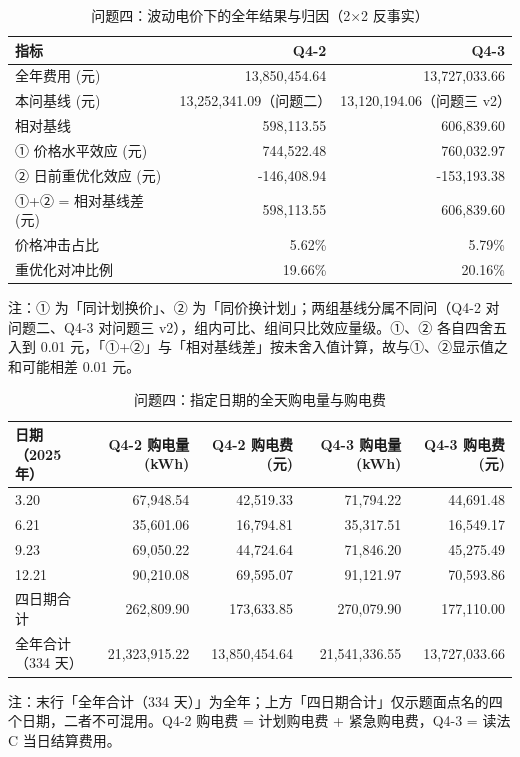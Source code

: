 \begin{table}[htbp]
\centering
\caption{问题四：波动电价下的全年结果与归因（2×2 反事实）}
\label{tab:q4-a}
\small
\setlength{\tabcolsep}{4pt}
\begin{tabular}{lrr}
\toprule
指标 & Q4-2 & Q4-3 \\
\midrule
全年费用 (元) & 13,850,454.64 & 13,727,033.66 \\
本问基线 (元) & 13,252,341.09（问题二） & 13,120,194.06（问题三 v2） \\
相对基线 & 598,113.55 & 606,839.60 \\
① 价格水平效应 (元) & 744,522.48 & 760,032.97 \\
② 日前重优化效应 (元) & -146,408.94 & -153,193.38 \\
①+② = 相对基线差 (元) & 598,113.55 & 606,839.60 \\
价格冲击占比 & 5.62\% & 5.79\% \\
重优化对冲比例 & 19.66\% & 20.16\% \\
\bottomrule
\end{tabular}
\vspace{2pt}
\begin{flushleft}\footnotesize 注：① 为「同计划换价」、② 为「同价换计划」；两组基线分属不同问（Q4-2 对问题二、Q4-3 对问题三 v2），组内可比、组间只比效应量级。①、② 各自四舍五入到 0.01 元，「①+②」与「相对基线差」按未舍入值计算，故与①、②显示值之和可能相差 0.01 元。\end{flushleft}
\end{table}
\begin{table}[htbp]
\centering
\caption{问题四：指定日期的全天购电量与购电费}
\label{tab:q4-b}
\small
\setlength{\tabcolsep}{4pt}
\begin{tabular}{lrrrr}
\toprule
日期（2025 年） & Q4-2 购电量 (kWh) & Q4-2 购电费 (元) & Q4-3 购电量 (kWh) & Q4-3 购电费 (元) \\
\midrule
3.20 & 67,948.54 & 42,519.33 & 71,794.22 & 44,691.48 \\
6.21 & 35,601.06 & 16,794.81 & 35,317.51 & 16,549.17 \\
9.23 & 69,050.22 & 44,724.64 & 71,846.20 & 45,275.49 \\
12.21 & 90,210.08 & 69,595.07 & 91,121.97 & 70,593.86 \\
四日期合计 & 262,809.90 & 173,633.85 & 270,079.90 & 177,110.00 \\
全年合计（334 天） & 21,323,915.22 & 13,850,454.64 & 21,541,336.55 & 13,727,033.66 \\
\bottomrule
\end{tabular}
\vspace{2pt}
\begin{flushleft}\footnotesize 注：末行「全年合计（334 天）」为全年；上方「四日期合计」仅示题面点名的四个日期，二者不可混用。Q4-2 购电费 = 计划购电费 + 紧急购电费，Q4-3 = 读法 C 当日结算费用。\end{flushleft}
\end{table}
